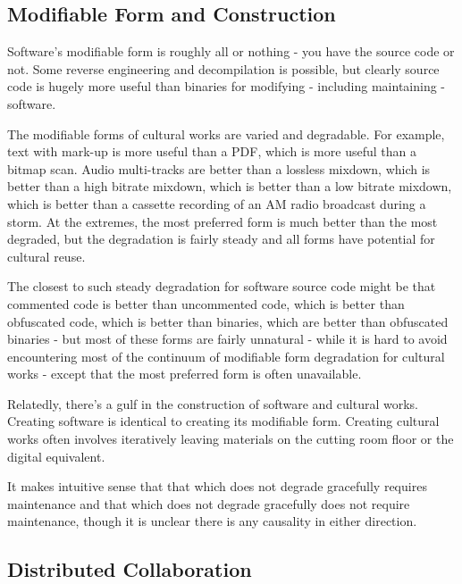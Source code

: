 \subsection{Modifiable Form and Construction}
\label{ss:free_culture_software_freedom:obvious_software:modifiable_form}

Software's modif\hbox{}iable form is roughly all or nothing - you have the
source code or not. Some reverse engineering and decompilation is possible, but
clearly source code is hugely more useful than binaries for modifying -
including maintaining - software.

The modif\hbox{}iable forms of cultural works are varied and degradable. For
example, text with mark-up is more useful than a PDF, which is more useful than
a bitmap scan. Audio multi-tracks are better than a lossless mixdown, which is
better than a high bitrate mixdown, which is better than a low bitrate mixdown,
which is better than a cassette recording of an AM radio broadcast during a
storm. At the extremes, the most preferred form is much better than the most
degraded, but the degradation is fairly steady and all forms have potential for
cultural reuse.

The closest to such steady degradation for software source code might be that
commented code is better than uncommented code, which is better than obfuscated
code, which is better than binaries, which are better than obfuscated binaries -
but most of these forms are fairly unnatural - while it is hard to avoid
encountering most of the continuum of modif\hbox{}iable form degradation for
cultural works - except that the most preferred form is often unavailable.

Relatedly, there's a gulf in the construction of software and cultural works.
Creating software is identical to creating its modif\hbox{}iable form. Creating
cultural works often involves iteratively leaving materials on the cutting room
f\hbox{}loor or the digital equivalent.

It makes intuitive sense that that which does not degrade gracefully requires
maintenance and that which does not degrade gracefully does not require
maintenance, though it is unclear there is any causality in either direction.


\subsection{Distributed Collaboration}
\label{ss:free_culture_software_freedom:obvious_software:distributed_collaboration}

